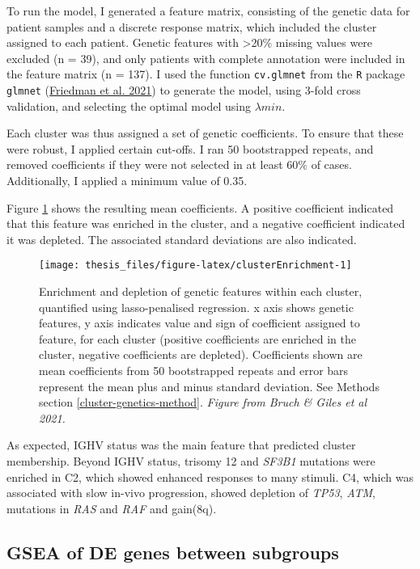 \documentclass[11pt, a4paper, twosided]{book}
\begin{document}
To run the model, I generated a feature matrix, consisting of the genetic data for patient samples and a discrete response matrix, which included the cluster assigned to each patient. Genetic features with \textgreater20\% missing values were excluded (n = 39), and only patients with complete annotation were included in the feature matrix (n = 137). I used the function \texttt{cv.glmnet} from the \texttt{R} package \texttt{glmnet} (\protect\hyperlink{ref-R-glmnet}{Friedman et al. 2021}) to generate the model, using 3-fold cross validation, and selecting the optimal model using \(\lambda{min}\).

Each cluster was thus assigned a set of genetic coefficients. To ensure that these were robust, I applied certain cut-offs. I ran 50 bootstrapped repeats, and removed coefficients if they were not selected in at least 60\% of cases. Additionally, I applied a minimum value of 0.35.

Figure \ref{fig:clusterEnrichment} shows the resulting mean coefficients. A positive coefficient indicated that this feature was enriched in the cluster, and a negative coefficient indicated it was depleted. The associated standard deviations are also indicated.


\begin{figure}

{\centering \texttt{[image: thesis\_files/figure-latex/clusterEnrichment-1]} 

}

\caption{Enrichment and depletion of genetic features within each cluster, quantified using lasso-penalised regression. x axis shows genetic features, y axis indicates value and sign of coefficient assigned to feature, for each cluster (positive coefficients are enriched in the cluster, negative coefficients are depleted). Coefficients shown are mean coefficients from 50 bootstrapped repeats and error bars represent the mean plus and minus standard deviation. See Methods section \ref{cluster-genetics-method}. \emph{Figure from Bruch \& Giles et al 2021. }}\label{fig:clusterEnrichment}
\end{figure}
As expected, IGHV status was the main feature that predicted cluster membership. Beyond IGHV status, trisomy 12 and \emph{SF3B1} mutations were enriched in C2, which showed enhanced responses to many stimuli. C4, which was associated with slow in-vivo progression, showed depletion of \emph{TP53}, \emph{ATM}, mutations in \emph{RAS} and \emph{RAF} and gain(8q).

\hypertarget{cluster-rna}{%
\subsection{GSEA of DE genes between subgroups}\label{cluster-rna}}
\end{document}
